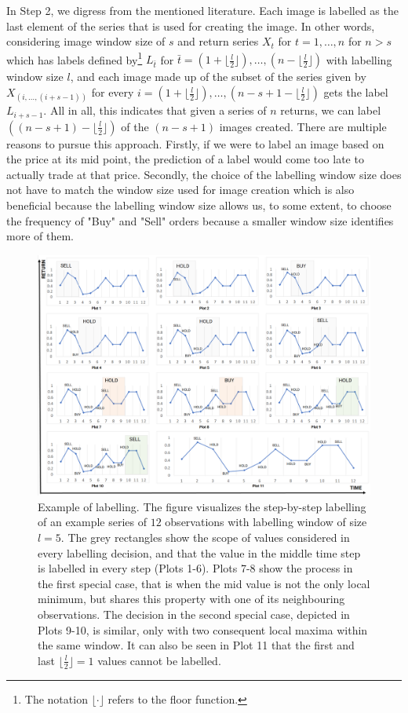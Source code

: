 \documentclass[11pt, a4paper]{article}
\begin{document}
In Step 2, we digress from the mentioned literature. Each image is labelled as the last element of the series that is used for creating the image. In other words, considering image window size of $s$ and return series $X_t$ for $t = 1, \dots, n$ for $n > s$ which has labels defined by\footnote{The notation $\lfloor \cdot \rfloor$ refers to the floor function.} 
$L_{\bar{t}}$ for 
$\bar{t} = \left(1+\lfloor \frac{l}{2} \rfloor\right), \dots, \left(n-\lfloor \frac{l}{2} \rfloor\right)$ with labelling window size $l$, and each image made up of the subset of the series given by
$X_{(i,\dots,(i+s-1))}$  
for every
$i = \left(1+\lfloor \frac{l}{2} \rfloor\right), \dots, \left(n-s+1-\lfloor \frac{l}{2} \rfloor\right)$ gets the label $L_{i+s-1}$. All in all, this indicates that given a series of $n$ returns, we can label $\left((n - s + 1)-\lfloor \frac{l}{2} \rfloor\right)$ of the $(n - s + 1)$ images created.
There are multiple reasons to pursue this approach. Firstly, if we were to label an image based on the price at its mid point, the prediction of a label would come too late to actually trade at that price. Secondly, the choice of the labelling window size does not have to match the window size used for image creation which is also beneficial because the labelling window size allows us, to some extent, to choose the frequency of "Buy" and "Sell" orders because a smaller window size identifies more of them. 

\begin{figure}[ht]
    \centering
    \includegraphics[width=\textwidth]{images/Labelling.png}
    \caption{Example of labelling. The figure visualizes the step-by-step labelling of an example series of $12$ observations with labelling window of size $l=5$. The grey rectangles show the scope of values considered in every labelling decision, and that the value in the middle time step is labelled in every step (Plots 1-6). Plots 7-8 show the process in the first special case, that is when the mid value is not the only local minimum, but shares this property with one of its neighbouring observations. The decision in the second special case, depicted in Plots 9-10, is similar, only with two consequent local maxima within the same window. It can also be seen in Plot 11 that the first and last $\lfloor \frac{l}{2} \rfloor = 1$ values cannot be labelled.}
    \label{fig:Labelling}
\end{figure}
\end{document}
